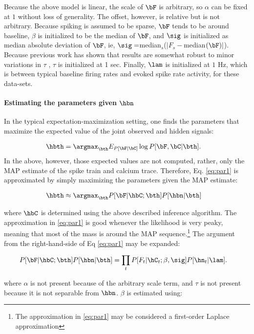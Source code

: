 Because the above model is linear, the scale of $\bF$ is arbitrary, so $\alpha$ can be fixed at $1$ without loss of generality.  The offset, however, is relative but is not arbitrary.  Because spiking is assumed to be sparse, $\bF$ tends to be around baseline, $\beta$ is initialized to be the median of $\bF$, and $\sig$ is initialized as median absolute deviation of $\bF$, ie, $\sig=$median$_s$($|F_s-$median$(\bF)|$).  Because previous work has shown that results are somewhat robust to minor variations in $\tau$ \cite{YaksiFriedrich06}, $\tau$ is initialized at 1 sec.  Finally, $\lam$ is initialized at $1$ Hz, which is between typical baseline firing rates and evoked spike rate activity, for these data-sets.

\paragraph{Estimating the parameters given $\hbn$}

In the typical expectation-maximization setting, one finds the parameters that maximize the expected value of the joint observed and hidden signals:

\begin{align} \label{eq:par1}
\hbth &= \argmax_{\bth} E_{P[\bF | \bC]} \log P[\bF, \bC | \bth].
\end{align}
In the above, however, those expected values are not computed, rather, only the MAP estimate of the spike train and calcium trace.  Therefore, Eq. \eqref{eq:par1} is approximated by simply maximizing the parameters given the MAP estimate:

\begin{align} \label{eq:par2}
\hbth &\approx \argmax_{\bth} P[\bF| \hbC; \bth] P[\hbn | \bth]
\end{align}

\noindent where $\hbC$ is determined using the above described inference algorithm. The approximation in \eqref{eq:par1} is good whenever the likelihood is very peaky, meaning that most of the mass is around the MAP sequence.\footnote{The approximation in \eqref{eq:par1} may be considered a first-order Laplace approximation}   The argument from the right-hand-side of Eq \eqref{eq:par1} may be expanded: 

\begin{align} \label{eq:par2}
P[\bF| \hbC; \bth] P[\hbn | \bth] &= \prod_t P[F_t | \hC_t; \beta,\sig]  P[\hn_t | \lam].
\end{align}

\noindent where $\alpha$ is not present because of the arbitrary scale term, and $\tau$ is not present because it is not separable from $\hbn$. $\beta$ is estimated using:

